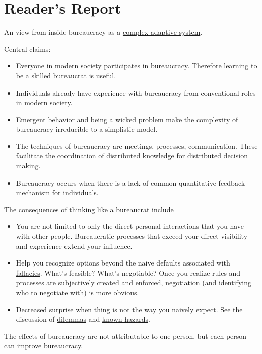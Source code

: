 \section{Reader's Report\label{sec:reader_report}}
An view from inside bureaucracy as a \href{https://en.wikipedia.org/wiki/Complexity_theory_and_organizations}{complex adaptive system}. 

Central claims:
\begin{itemize}
    \item Everyone in modern society participates in bureaucracy. Therefore learning to be a skilled bureaucrat is useful.
    \item Individuals already have experience with bureaucracy from conventional roles in modern society. 
    \item Emergent behavior and being a \href{https://en.wikipedia.org/wiki/Wicked_problem}{wicked problem} make the complexity of bureaucracy irreducible to a simplistic model.
    \item The techniques of bureaucracy are meetings, processes, communication. These facilitate the coordination of distributed knowledge for distributed decision making.  
    \item Bureaucracy occurs when there is a lack of common quantitative feedback mechanism for individuals.
\end{itemize}
The consequences of thinking like a bureaucrat include
\begin{itemize}
    \item You are not limited to only the direct personal interactions that you have with other people. Bureaucratic processes that exceed your direct visibility and experience extend your influence.
    \item Help you recognize options beyond the naive defaults associated with \hyperref[sec:fallacies]{fallacies}.
    What's feasible? What's negotiable? Once you realize rules and processes are subjectively created and enforced, negotiation (and identifying who to negotiate with) is more obvious.
    \item Decreased surprise when thing is not the way you naively expect. See the discussion of \hyperref[sec:dilemma-trilemma]{dilemmas}
    and 
    \hyperref[sec:unavoidable-hazards]{known hazards}.
\end{itemize}


The effects of bureaucracy are not attributable to one person, but each person can improve bureaucracy.